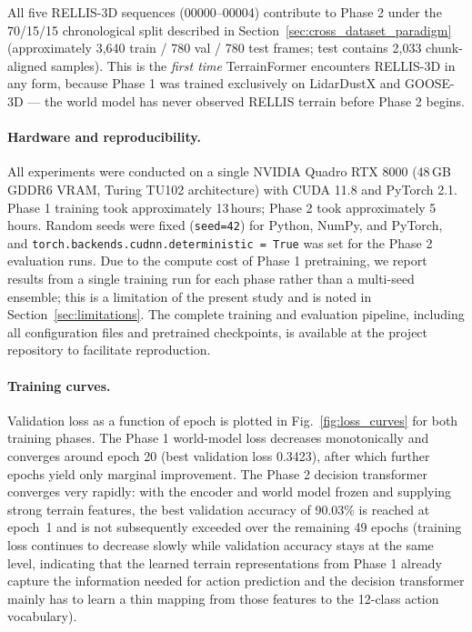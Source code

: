 \documentclass[sensors,article,submit,pdftex,moreauthors]{Definitions/mdpi}
\begin{document}
All five RELLIS-3D sequences (00000--00004) contribute to Phase 2 under the 70/15/15 chronological split described in Section~\ref{sec:cross_dataset_paradigm} (approximately 3,640 train / 780 val / 780 test frames; test contains 2,033 chunk-aligned samples). This is the \emph{first time} TerrainFormer encounters RELLIS-3D in any form, because Phase 1 was trained exclusively on LidarDustX and GOOSE-3D --- the world model has never observed RELLIS terrain before Phase 2 begins.

\paragraph{Hardware and reproducibility.}
All experiments were conducted on a single NVIDIA Quadro RTX 8000 (48\,GB GDDR6 VRAM, Turing TU102 architecture) with CUDA 11.8 and PyTorch 2.1. Phase 1 training took approximately 13\,hours; Phase 2 took approximately 5\,hours. Random seeds were fixed (\texttt{seed=42}) for Python, NumPy, and PyTorch, and \texttt{torch.backends.cudnn.deterministic = True} was set for the Phase 2 evaluation runs. Due to the compute cost of Phase 1 pretraining, we report results from a single training run for each phase rather than a multi-seed ensemble; this is a limitation of the present study and is noted in Section~\ref{sec:limitations}. The complete training and evaluation pipeline, including all configuration files and pretrained checkpoints, is available at the project repository to facilitate reproduction.

\paragraph{Training curves.}
Validation loss as a function of epoch is plotted in Fig.~\ref{fig:loss_curves} for both training phases. The Phase 1 world-model loss decreases monotonically and converges around epoch 20 (best validation loss 0.3423), after which further epochs yield only marginal improvement. The Phase 2 decision transformer converges very rapidly: with the encoder and world model frozen and supplying strong terrain features, the best validation accuracy of 90.03\% is reached at epoch~1 and is not subsequently exceeded over the remaining 49 epochs (training loss continues to decrease slowly while validation accuracy stays at the same level, indicating that the learned terrain representations from Phase 1 already capture the information needed for action prediction and the decision transformer mainly has to learn a thin mapping from those features to the 12-class action vocabulary).
\end{document}
